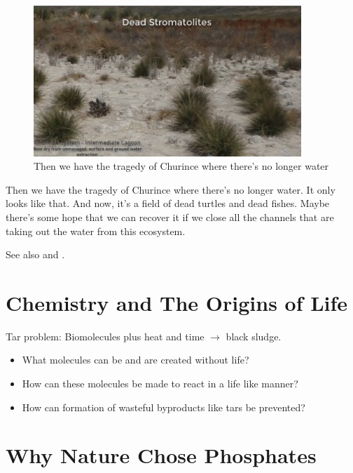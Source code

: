 \documentclass[]{article}
\begin{document}
\begin{figure}[h!]
	\caption{Then we have the tragedy of Churince where there's no longer water} 
	\includegraphics[width=0.9\textwidth]{CuatroCienegas11}
\end{figure}

Then we have the tragedy of Churince where there's no longer water. It only looks like that. And now, it's a field of dead turtles and dead fishes. Maybe there's some hope that we can recover it if we close all the channels that are taking out the water from this ecosystem.

See also \cite{gomez2018leptolyngbya} and \cite{taboada2018geographic}.

\section{Chemistry and The Origins of Life}

Tar problem: Biomolecules plus heat and time $\rightarrow$ black sludge.

\begin{itemize}
	\item What molecules can be and are created without life?
	\item How can these molecules be made to react in a life like manner?
	\item How can formation of wasteful byproducts like	tars be prevented?
\end{itemize}
\section{Why Nature Chose Phosphates}
\end{document}
